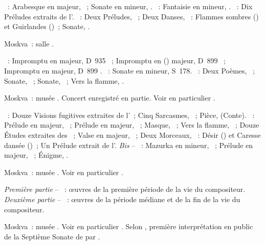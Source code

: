 \begin{description}
 \textsc{\Schumann{}}~: Arabesque en \kC majeur, ~; Sonate en \kF
 mineur, .
 \textsc{\Chopin{}}~: Fantaisie en \kF mineur, .
 \textsc{\Chostakovitch{}}~: Dix Préludes extraits de l'.
 \textsc{\Scriabine{}}~: Deux Préludes, ~; Deux Danses, ~:
 Flammes sombres () et Guirlandes ()~; Sonate,
 .
 \item[\DateWithWeekDay{1955-01-26}]
 Moskva~: salle \Tchaikovski{}.

 \textsc{\Schubert{}}~: Impromptu en \kA \Flat majeur, D~935 ~;
 Impromptu en \kG (\Flat) majeur, D~899 ~; Impromptu en \kA \Flat
 majeur, D~899 .
 \textsc{\Liszt{}}~: Sonate en \kB mineur, S~178.
 \textsc{\Scriabine{}}~: Deux Poèmes, ~; Sonate, ~;
 Sonate, ~; Vers la flamme, .
 \item[\DateWithWeekDay{1955-04-10}]
 Moskva~: musée \Scriabine{}.
 Concert enregistré en partie.
 Voir en particulier \citet[p.~448]{Milshteyn82a}.

 \textsc{\Prokofiev{}}~: Douze Visions fugitives extraites de l'~;
 Cinq Sarcasmes, ~; Pièce,   (Conte).
 \textsc{\Scriabine{}}~: Prélude en \kF majeur,  ~;
 Prélude en \kC majeur,  ~; Masque, 
 ~; Vers la flamme, ~; Douze Études extraites des
 ~; Valse en \kA \Flat
 majeur, ~; Deux Morceaux, ~: Désir () et
 Caresse dansée ()~; Un Prélude extrait de l'.
 \emph{Bis} -- \textsc{\Scriabine{}}~: Mazurka en \kE mineur, 
 ~; Prélude en \kC majeur,  ~; Énigme,
  .
 \item[\DateWithWeekDay{1955-04-29}]
 Moskva~: musée \Scriabine{}.
 Voir en particulier \citet[p.~449]{Milshteyn82a}.

 \emph{Première partie} -- \textsc{\Scriabine{}}~: œuvres de la première
 période de la vie du compositeur.
 \emph{Deuxième partie} -- \textsc{\Scriabine{}}~: œuvres de la période
 médiane et de la fin de la vie du compositeur.
 \item[\DateWithWeekDay{1955-05-14}]
 Moskva~: musée \Scriabine{}.
 Voir en particulier \citet[p.~449]{Milshteyn82a}.
 Selon \citet[p.~391]{Shiryaeva}, première interprétation en public de la
 Septième Sonate de \Prokofiev{} par \Sofronitsky{}.


\end{description}
